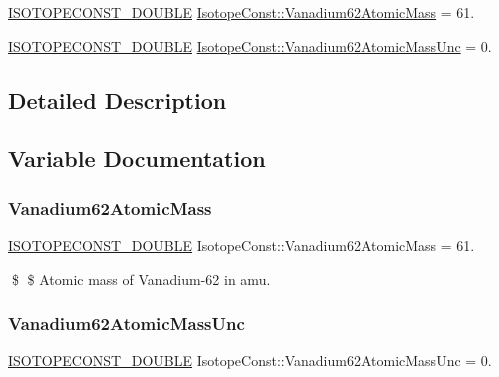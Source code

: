 \begin{DoxyCompactItemize}
\item 
\mbox{\hyperlink{group___isotope_const-_macros_ga8f45a7272ce02c0b4c65c44636ed719a}{I\+S\+O\+T\+O\+P\+E\+C\+O\+N\+S\+T\+\_\+\+D\+O\+U\+B\+LE}} \mbox{\hyperlink{group___isotope_const-_vanadium-_v62_ga71c7be077217c4d817c05818cfd296ed}{Isotope\+Const\+::\+Vanadium62\+Atomic\+Mass}} = 61.
\item 
\mbox{\hyperlink{group___isotope_const-_macros_ga8f45a7272ce02c0b4c65c44636ed719a}{I\+S\+O\+T\+O\+P\+E\+C\+O\+N\+S\+T\+\_\+\+D\+O\+U\+B\+LE}} \mbox{\hyperlink{group___isotope_const-_vanadium-_v62_ga980f061aa463e8d60918911c944924f8}{Isotope\+Const\+::\+Vanadium62\+Atomic\+Mass\+Unc}} = 0.
\end{DoxyCompactItemize}


\subsection{Detailed Description}


\subsection{Variable Documentation}
\mbox{\label{group___isotope_const-_vanadium-_v62_ga71c7be077217c4d817c05818cfd296ed}} 
\subsubsection{\texorpdfstring{Vanadium62\+Atomic\+Mass}{Vanadium62AtomicMass}}
{\footnotesize\ttfamily \mbox{\hyperlink{group___isotope_const-_macros_ga8f45a7272ce02c0b4c65c44636ed719a}{I\+S\+O\+T\+O\+P\+E\+C\+O\+N\+S\+T\+\_\+\+D\+O\+U\+B\+LE}} Isotope\+Const\+::\+Vanadium62\+Atomic\+Mass = 61.}

\$ \$ Atomic mass of Vanadium-\/62 in amu. \mbox{\label{group___isotope_const-_vanadium-_v62_ga980f061aa463e8d60918911c944924f8}} 
\subsubsection{\texorpdfstring{Vanadium62\+Atomic\+Mass\+Unc}{Vanadium62AtomicMassUnc}}
{\footnotesize\ttfamily \mbox{\hyperlink{group___isotope_const-_macros_ga8f45a7272ce02c0b4c65c44636ed719a}{I\+S\+O\+T\+O\+P\+E\+C\+O\+N\+S\+T\+\_\+\+D\+O\+U\+B\+LE}} Isotope\+Const\+::\+Vanadium62\+Atomic\+Mass\+Unc = 0.}

